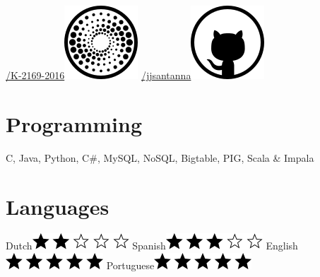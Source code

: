 \documentclass[print]{styles/friggeri-cv-mac} %
\begin{document}
\begin{aside}
\href{http://www.researcherid.com/rid/K-2169-2016}{/K-2169-2016}\includegraphics[scale=0.3]{img/researchid.png}
\href{https://github.com/jjsantanna}{/jjsantanna\includegraphics[scale=0.3]{img/github.png}}
\section{Programming}
C, Java, Python, C\#, 
MySQL, NoSQL, Bigtable, 
PIG, Scala \& Impala
~
\section{Languages}
Dutch\includegraphics[scale=0.40]{img/2stars.png}
Spanish\includegraphics[scale=0.40]{img/3stars.png}
English\includegraphics[scale=0.40]{img/5stars.png}
Portuguese\includegraphics[scale=0.40]{img/5stars.png}
\end{aside}
\end{document}
